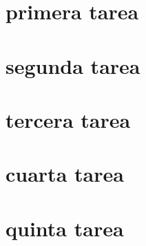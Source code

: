 \chapter{primera tarea}
    
\chapter{segunda tarea}
    
\chapter{tercera tarea}
    
\chapter{cuarta tarea}
    
\chapter{quinta tarea}
    
